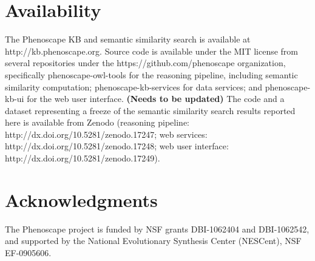 \documentclass{article}
\begin{document}
\section{Availability}
The Phenoscape KB and semantic similarity search is available at http://kb.phenoscape.org. Source code is available under the MIT license from several repositories under the https://github.com/phenoscape organization, specifically phenoscape-owl-tools for the reasoning pipeline, including semantic similarity computation; phenoscape-kb-services for data services; and phenoscape-kb-ui for the web user interface.  \textbf{(Needs to be updated)} The code and a dataset representing a freeze of the semantic similarity search results reported here is available from Zenodo (reasoning pipeline: http://dx.doi.org/10.5281/zenodo.17247; web services: http://dx.doi.org/10.5281/zenodo.17248; web user interface: http://dx.doi.org/10.5281/zenodo.17249).

\section{Acknowledgments}
The Phenoscape project is funded by NSF grants DBI-1062404 and DBI-1062542, and supported by the National Evolutionary Synthesis Center (NESCent), NSF EF-0905606. 
\end{document}
